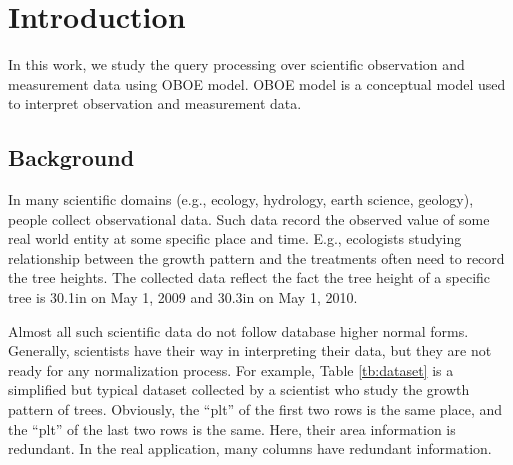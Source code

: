 \section{Introduction}\label{sec:intro}
In this work, we study the query processing over scientific
observation and measurement data using OBOE
model\cite{DBLP:conf/er/BowersMS08}. OBOE model is a conceptual model
used to interpret observation and measurement data. 

\subsection{Background}

In many scientific domains (e.g., ecology, hydrology, earth science,
geology), people collect observational data. Such data
record the observed value of some real world entity at some specific
place and time. E.g., ecologists studying relationship between the 
growth pattern and the treatments often need to record the tree
heights. The collected data reflect the fact the tree height of a
specific tree is 30.1in on May 1, 2009 and 30.3in on May 1, 2010. 

Almost all such scientific data do not follow database higher normal
forms. Generally, scientists have their way in interpreting their
data, but they are not ready for any normalization process. 
For example, Table \ref{tb:dataset} is a simplified but typical dataset collected by
a scientist who study the growth pattern of trees. 
Obviously, the ``plt'' of the first two rows is the same place, and
the ``plt'' of the last two rows is the same. 
Here, their area information is redundant. 
In the real application, many columns have redundant information. 



